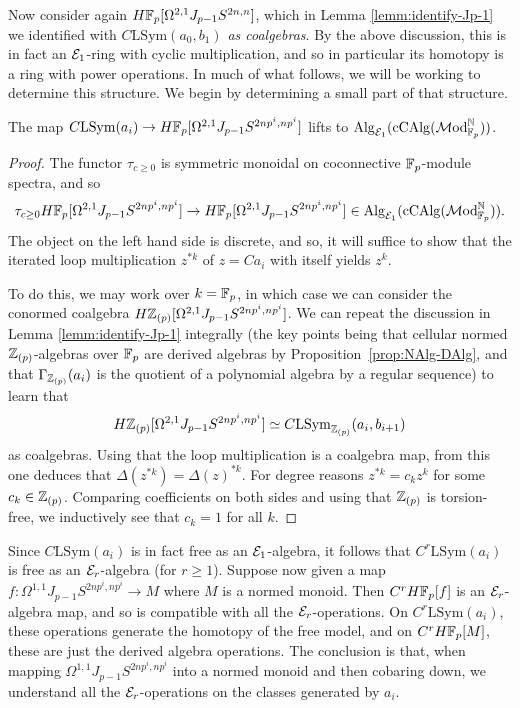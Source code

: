 \documentclass{amsart}
\numberwithin{proposition}{section}
\numberwithin{equation}{section}
\def\LSym{\mathrm{LSym}}
\def\cCAlg{\mathrm{cCAlg}}
\begin{document}
Now consider again $H\mathbb{F}_p[\Omega^{2,1}J_{p-1}S^{2n,n}]$, which in Lemma \ref{lemm:identify-Jp-1} we identified with $C\LSym(a_0, b_1)$ \emph{as coalgebras}.
By the above discussion, this is in fact an $\mathcal E_1$-ring with cyclic multiplication, and so in particular its homotopy is a ring with power operations.
In much of what follows, we will be working to determine this structure.
We begin by determining a small part of that structure.
\begin{lemma}
The map $C\LSym(a_i) \to H\F_p[\Omega^{2,1}J_{p-1}S^{2np^i,np^i}]$ lifts to $\Alg_{\scr E_1}(\cCAlg(\Mod_{\F_p}^\N))$.
\end{lemma}
\begin{proof}
The functor $\tau_{c \ge 0}$ is symmetric monoidal on coconnective $\mathbb{F}_p$-module spectra, and so \[ \tau_{c \ge 0} H\F_p[\Omega^{2,1}J_{p-1}S^{2np^i,np^i}] \to H\F_p[\Omega^{2,1}J_{p-1}S^{2np^i,np^i}] \in \Alg_{\scr E_1}(\cCAlg(\Mod_{\F_p}^\N)). \]
The object on the left hand side is discrete, and so, it will suffice to show that the iterated loop multiplication $z^{*k}$ of $z=Ca_i$ with itself yields $z^k$.

To do this, we may work over $k=\mathbb{F}_p$, in which case we can consider the conormed coalgebra $H\mathbb{Z}_{(p)}[\Omega^{2,1}J_{p-1}S^{2np^i,np^i}]$.
We can repeat the discussion in Lemma \ref{lemm:identify-Jp-1} integrally (the key points being that cellular normed $\mathbb{Z}_{(p)}$-algebras over $\mathbb{F}_p$ are derived algebras by Proposition~\ref{prop:NAlg-DAlg}, and that $\Gamma_{\mathbb{Z}_{(p)}}(a_i)$ is the quotient of a polynomial algebra by a regular sequence) to learn that \[ H\Z_{(p)}[\Omega^{2,1}J_{p-1}S^{2np^i,np^i}] \wequi C\LSym_{\Z_{(p)}}(a_i, b_{i+1}) \] as coalgebras.
Using that the loop multiplication is a coalgebra map, from this one deduces that $\Delta(z^{*k}) = \Delta(z)^{*k}$.
For degree reasons $z^{*k} = c_k z^k$ for some $c_k \in \mathbb{Z}_{(p)}$.
Comparing coefficients on both sides and using that $\mathbb{Z}_{(p)}$ is torsion-free, we inductively see that $c_k = 1$ for all $k$.
\end{proof}

\begin{remark} \label{rmk:a-family}
Since $C\LSym(a_i)$ is in fact free as an $\mathcal E_1$-algebra, it follows that $C^r \LSym(a_i)$ is free as an $\mathcal E_r$-algebra (for $r \ge 1$).
Suppose now given a map $f: \Omega^{1,1}J_{p-1}S^{2np^i,np^i} \to M$ where $M$ is a normed monoid.
Then $C^r H\mathbb{F}_p[f]$ is an $\mathcal E_r$-algebra map, and so is compatible with all the $\mathcal E_r$-operations.
On $C^r\LSym(a_i)$, these operations generate the homotopy of the free model, and on $C^r H\mathbb{F}_p[M]$, these are just the derived algebra operations.
The conclusion is that, when mapping $\Omega^{1,1}J_{p-1}S^{2np^i,np^i}$ into a normed monoid and then cobaring down, we understand all the $\mathcal E_r$-operations on the classes generated by $a_i$.
\end{remark}
\end{document}
